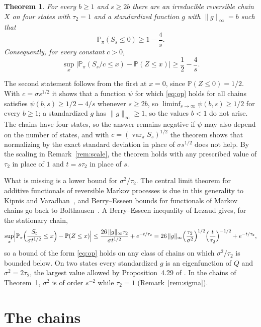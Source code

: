 \documentclass[11pt]{amsart}
\newtheorem{theorem}{Theorem}
\theoremstyle{remark}
\numberwithin{equation}{section}
\newcommand{\Pp}{\mathbb P}
\DeclareMathOperator{\var}{var}
\begin{document}
\begin{theorem}\label{thm:main}
For every $b\ge1$ and $s\ge2b$ there are an irreducible reversible chain $X$ on four states with $\tau_2=1$ and a standardized function $g$ with $\|g\|_\infty=b$ such that
\[
\Pp_\pi(S_s\le0)\ge1-\frac4s .
\]
Consequently, for every constant $c>0$,
\[
\sup_x\bigl|\Pp_\pi(S_s/c\le x)-\Pp(Z\le x)\bigr|\ge\frac12-\frac4s .
\]
\end{theorem}

The second statement follows from the first at $x=0$, since $\Pp(Z\le0)=1/2$. With $c=\sigma s^{1/2}$ it shows that a function $\psi$ for which \eqref{eq:op} holds for all chains satisfies $\psi(b,s)\ge1/2-4/s$ whenever $s\ge2b$, so $\liminf_{s\to\infty}\psi(b,s)\ge1/2$ for every $b\ge1$; a standardized $g$ has $\|g\|_\infty\ge1$, so the values $b<1$ do not arise. The chains have four states, so the answer remains negative if $\psi$ may also depend on the number of states, and with $c=(\var_\pi S_s)^{1/2}$ the theorem shows that normalizing by the exact standard deviation in place of $\sigma s^{1/2}$ does not help. By the scaling in Remark~\ref{rem:scale}, the theorem holds with any prescribed value of $\tau_2$ in place of $1$ and $t=s\tau_2$ in place of $s$.

What is missing is a lower bound for $\sigma^2/\tau_2$. The central limit theorem for additive functionals of reversible Markov processes is due in this generality to Kipnis and Varadhan~\cite{KV86}, and Berry--Esseen bounds for functionals of Markov chains go back to Bolthausen~\cite{Bol80}. A Berry--Esseen inequality of Lezaud \cite[Theorem~3.1]{Lez01} gives, for the stationary chain,
\begin{equation}\label{eq:lezaud}
\sup_x\Bigl|\Pp_\pi\Bigl(\frac{S_t}{\sigma t^{1/2}}\le x\Bigr)-\Pp(Z\le x)\Bigr|\le\frac{26\,\|g\|_\infty\tau_2}{\sigma t^{1/2}}+e^{-t/\tau_2}
=26\,\|g\|_\infty\Bigl(\frac{\tau_2}{\sigma^2}\Bigr)^{1/2}\Bigl(\frac t{\tau_2}\Bigr)^{-1/2}+e^{-t/\tau_2},
\end{equation}
so a bound of the form \eqref{eq:op} holds on any class of chains on which $\sigma^2/\tau_2$ is bounded below. On two states every standardized $g$ is an eigenfunction of $Q$ and $\sigma^2=2\tau_2$, the largest value allowed by Proposition~4.29 of \cite{AF}. In the chains of Theorem~\ref{thm:main}, $\sigma^2$ is of order $s^{-2}$ while $\tau_2=1$ (Remark~\ref{rem:sigma}).

\section{The chains}\label{sec:chains}
\end{document}
